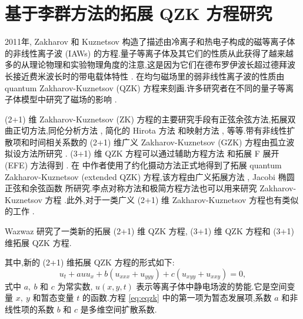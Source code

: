 \chapter{基于李群方法的拓展 QZK 方程研究}

2011年, Zakharov 和 Kuznetsov \cite{abdou2011quant} 构造了描述由冷离子和热电子构成的磁等离子体的非线性离子波 (IAWs) 的方程.量子等离子体及其它们的性质从此获得了越来越多的从理论物理和实验物理角度的注意,这是因为它们在德布罗伊波长超过德拜波长接近费米波长时的带电载体特性 \cite{abdou2011quant,ahmed2013kinks,bhrawy2013soli,biswas20091soli,biswas2013soli,bluman2010appli,elganaini2011tra,godleswski2004the,guner2015bright,ibragimov2006inte}. 在均匀磁场里的弱非线性离子波的性质由 quantum Zakharov-Kuznetsov (QZK) 方程来刻画.许多研究者在不同的量子等离子体模型中研究了磁场的影响 \cite{ibragimov2007anew,iwasaki1990cylin,johnpilai2011sym,khan2008linear,krishnan2010sol,leveque1992num,linares2009well,linares2011local,morris2013soli,moslem2007soli,mothibi2015con,moussa2001simi,munro2014con,munro2000sta,mushtaq2005non,olver2000app,peng2008exact,sabry2009non}.

(2+1) 维 Zakharov-Kuznetsov (ZK) 方程的主要研究手段有正弦余弦方法,拓展双曲正切方法,同伦分析方法 \cite{linares2009well}, 简化的 Hirota 方法 \cite{biswas2013soli,bluman2010appli} 和映射方法 \cite{morris2013soli}, 等等.带有非线性扩散项和时间相关系数的 (2+1) 维广义 Zakharov-Kuznetsov (GZK) 方程由孤立波拟设方法所研究 \cite{sabry2009non}. (3+1) 维 QZK 方程可以通过辅助方程方法 \cite{ahmed2013kinks} 和拓展 F 展开 (EFE) 方法得到 \cite{munro2000sta}. 在 \cite{ahmed2013kinks} 中作者使用了约化摄动方法正式地得到了拓展 quantum Zakharov-Kuznetsov (extended QZK) 方程,该方程由广义拓展方法 \cite{guner2015bright}, Jacobi 椭圆正弦和余弦函数 \cite{biswas20091soli} 所研究.李点对称方法和极简方程方法也可以用来研究 Zakharov-Kuznetsov 方程 \cite{leveque1992num}.此外,对于一类广义 (2+1) 维 Zakharov-Kuznetsov 方程也有类似的工作 \cite{moslem2007soli}.

Wazwaz \cite{elganaini2011tra} 研究了一类新的拓展 (2+1) 维 QZK 方程, (3+1) 维 QZK 方程和 (3+1) 维拓展 QZK 方程.

其中,新的 (2+1) 维拓展 QZK 方程的形式如下:
\begin{equation}\label{eq:eqzk}
u_{t}+auu_{x}+b(u_{xxx}+u_{yyy})+c(u_{xyy}+u_{xxy})=0,
\end{equation}
式中 $a,~b$ 和 $c$ 为常实数, $u(x, y, t)$ 表示等离子体中静电场波的势能.它是空间变量 $x,~y$ 和暂态变量 $t$ 的函数.方程 \eqref{eq:eqzk} 中的第一项为暂态发展项,系数 $a$ 和非线性项的系数 $b$ 和 $c$ 是多维空间扩散系数.

